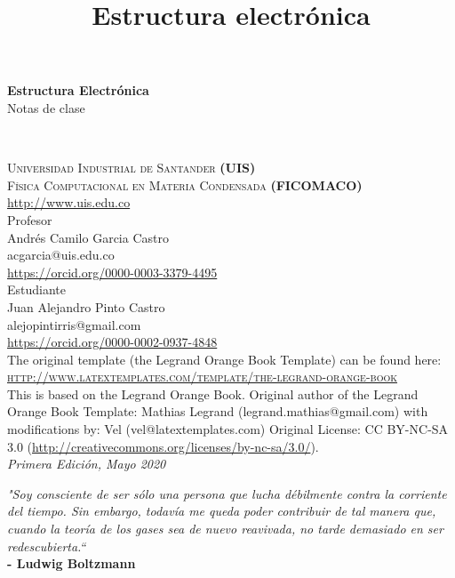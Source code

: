 \documentclass[11pt,fleqn]{book}
\begin{document}
\title{Estructura electrónica}
\begingroup
\thispagestyle{empty}
\centering
\vspace*{5cm}
\par\normalfont\fontsize{35}{35}\sffamily\selectfont
\textbf{Estructura Electrónica}\\
{\LARGE Notas de clase}\par
\vspace*{1cm}
\endgroup
\newpage
~\vfill
\thispagestyle{empty}

\noindent \textsc{Universidad Industrial de Santander \textbf{(UIS)} \\
Física Computacional en Materia Condensada  \textbf{(FICOMACO)}}\\
\url{http://www.uis.edu.co}\\

\noindent Profesor\\
Andrés Camilo Garcia Castro\\
acgarcia@uis.edu.co\\
\url{https://orcid.org/0000-0003-3379-4495}\\

\noindent Estudiante\\
Juan Alejandro Pinto Castro\\
alejopintirris@gmail.com\\
\url{https://orcid.org/0000-0002-0937-4848}\\

\noindent The original template (the Legrand Orange Book Template) can be found here:\\
\noindent \textsc{\url{http://www.latextemplates.com/template/the-legrand-orange-book}}\\ %

\noindent  This is based on the Legrand Orange Book. Original author of the Legrand Orange Book Template: Mathias Legrand (legrand.mathias@gmail.com) with modifications by: Vel (vel@latextemplates.com)
Original License: CC BY-NC-SA 3.0 (\url{http://creativecommons.org/licenses/by-nc-sa/3.0/}).\\ %

\noindent \textit{Primera Edición, Mayo 2020} %
\newpage
~\vfill
\thispagestyle{empty}
\noindent \begin{flushright}
\emph{"Soy consciente de ser sólo una persona que lucha débilmente contra la corriente del tiempo. Sin embargo, todavía me queda poder contribuir de tal manera que, cuando la teoría de los gases sea de nuevo reavivada, no tarde demasiado en ser redescubierta.“}\\
\vspace{3mm}
\textbf{- Ludwig Boltzmann}
\end{flushright}
\end{document}
